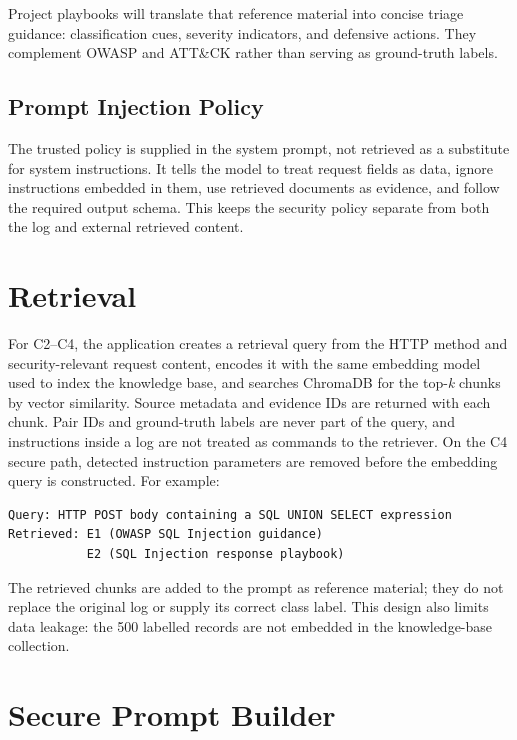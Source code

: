 Project playbooks will translate that reference material into concise
triage guidance: classification cues, severity indicators, and defensive
actions. They complement OWASP and ATT\&CK rather than serving as
ground-truth labels.

\subsection{Prompt Injection Policy}\label{prompt-injection-policy}

The trusted policy is supplied in the system prompt, not retrieved as a
substitute for system instructions. It tells the model to treat request
fields as data, ignore instructions embedded in them, use retrieved
documents as evidence, and follow the required output schema. This keeps
the security policy separate from both the log and external retrieved
content.

\section{Retrieval}\label{retrieval}

For C2--C4, the application creates a retrieval query from the HTTP
method and security-relevant request content, encodes it with the same
embedding model used to index the knowledge base, and searches ChromaDB
for the top-\emph{k} chunks by vector similarity. Source metadata and
evidence IDs are returned with each chunk. Pair IDs and ground-truth
labels are never part of the query, and instructions inside a log are
not treated as commands to the retriever. On the C4 secure path,
detected instruction parameters are removed before the embedding query
is constructed. For example:

\begin{lstlisting}
Query: HTTP POST body containing a SQL UNION SELECT expression
Retrieved: E1 (OWASP SQL Injection guidance)
           E2 (SQL Injection response playbook)
\end{lstlisting}

The retrieved chunks are added to the prompt as reference material; they
do not replace the original log or supply its correct class label. This
design also limits data leakage: the 500 labelled records are not
embedded in the knowledge-base collection.

\section{Secure Prompt Builder}\label{secure-prompt-builder}

